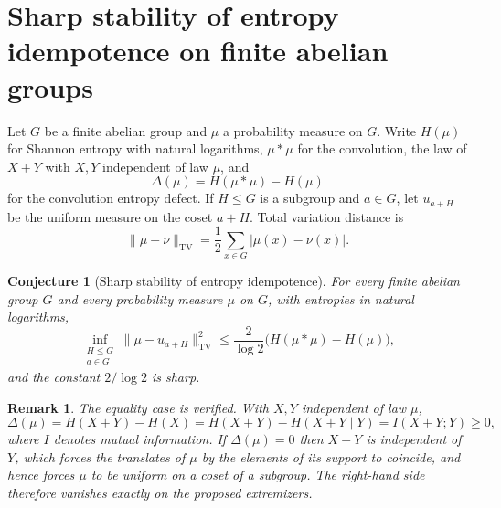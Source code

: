 \documentclass[11pt]{article}
\newtheorem{conjecture}{Conjecture}
\newtheorem{remark}{Remark}
\theoremstyle{definition}
\begin{document}
\section{Sharp stability of entropy idempotence on finite abelian groups}

Let $G$ be a finite abelian group and $\mu$ a probability measure on
$G$.  Write $H(\mu)$ for Shannon entropy with natural logarithms,
$\mu*\mu$ for the convolution, the law of $X+Y$ with $X,Y$
independent of law $\mu$, and
\[
\Delta(\mu)=H(\mu*\mu)-H(\mu)
\]
for the convolution entropy defect.  If $H\le G$ is a subgroup and
$a\in G$, let $u_{a+H}$ be the uniform measure on the coset $a+H$.
Total variation distance is
\[
\|\mu-\nu\|_{\mathrm{TV}}=\frac12\sum_{x\in G}|\mu(x)-\nu(x)| .
\]

\begin{conjecture}[Sharp stability of entropy idempotence]\label{t5}
For every finite abelian group $G$ and every probability measure
$\mu$ on $G$, with entropies in natural logarithms,
\[
\inf_{\substack{H\le G\\a\in G}}
\|\mu-u_{a+H}\|_{\mathrm{TV}}^2
\le
\frac{2}{\log2}\bigl(H(\mu*\mu)-H(\mu)\bigr),
\]
and the constant $2/\log2$ is sharp.
\end{conjecture}

\begin{remark}\label{t5:equality}
The equality case is verified.  With $X,Y$ independent of law $\mu$,
\[
\Delta(\mu)=H(X+Y)-H(X)=H(X+Y)-H(X+Y\mid Y)=I(X+Y;Y)\ge0,
\]
where $I$ denotes mutual information.  If $\Delta(\mu)=0$ then $X+Y$
is independent of $Y$, which forces the translates of $\mu$ by the
elements of its support to coincide, and hence forces $\mu$ to be
uniform on a coset of a subgroup.  The right-hand side therefore
vanishes exactly on the proposed extremizers.
\end{remark}
\end{document}
